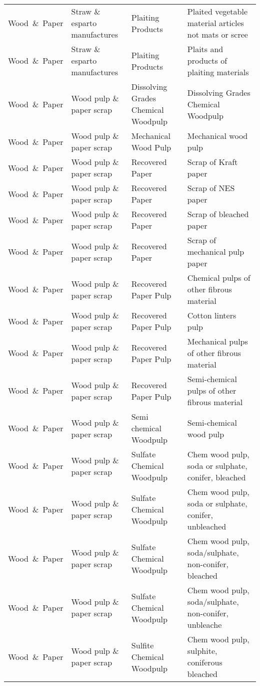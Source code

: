 \begin{appendices}
\begin{xltabular}{\textwidth}{|p{0.10\textwidth}|p{0.25\textwidth}|p{0.20\textwidth}|p{0.35\textwidth}|}
			Wood\ \&\ Paper & Straw \& esparto manufactures & Plaiting Products & Plaited vegetable material articles not mats or scree \\
			Wood\ \&\ Paper & Straw \& esparto manufactures & Plaiting Products & Plaits and products of plaiting materials \\
			Wood\ \&\ Paper & Wood pulp \& paper scrap & Dissolving Grades Chemical Woodpulp & Dissolving Grades Chemical Woodpulp \\
			Wood\ \&\ Paper & Wood pulp \& paper scrap & Mechanical Wood Pulp & Mechanical wood pulp \\
			Wood\ \&\ Paper & Wood pulp \& paper scrap & Recovered Paper & Scrap of Kraft paper \\
			Wood\ \&\ Paper & Wood pulp \& paper scrap & Recovered Paper & Scrap of NES paper \\
			Wood\ \&\ Paper & Wood pulp \& paper scrap & Recovered Paper & Scrap of bleached paper \\
			Wood\ \&\ Paper & Wood pulp \& paper scrap & Recovered Paper & Scrap of mechanical pulp paper \\
			Wood\ \&\ Paper & Wood pulp \& paper scrap & Recovered Paper Pulp & Chemical pulps of other fibrous material \\
			Wood\ \&\ Paper & Wood pulp \& paper scrap & Recovered Paper Pulp & Cotton linters pulp \\
			Wood\ \&\ Paper & Wood pulp \& paper scrap & Recovered Paper Pulp & Mechanical pulps of other fibrous material \\
			Wood\ \&\ Paper & Wood pulp \& paper scrap & Recovered Paper Pulp & Semi-chemical pulps of other fibrous material \\
			Wood\ \&\ Paper & Wood pulp \& paper scrap & Semi chemical Woodpulp & Semi-chemical wood pulp \\
			Wood\ \&\ Paper & Wood pulp \& paper scrap & Sulfate Chemical Woodpulp & Chem wood pulp, soda or sulphate, conifer, bleached \\
			Wood\ \&\ Paper & Wood pulp \& paper scrap & Sulfate Chemical Woodpulp & Chem wood pulp, soda or sulphate, conifer, unbleached \\
			Wood\ \&\ Paper & Wood pulp \& paper scrap & Sulfate Chemical Woodpulp & Chem wood pulp, soda/sulphate, non-conifer, bleached \\
			Wood\ \&\ Paper & Wood pulp \& paper scrap & Sulfate Chemical Woodpulp & Chem wood pulp, soda/sulphate, non-conifer, unbleache \\
			Wood\ \&\ Paper & Wood pulp \& paper scrap & Sulfite Chemical Woodpulp & Chem wood pulp, sulphite, coniferous bleached \\

\end{xltabular}
\end{appendices}
